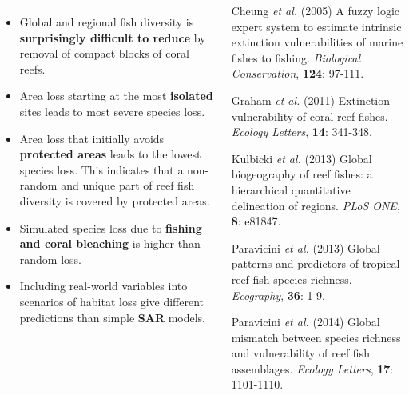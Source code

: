 \documentclass[25pt, a0paper, portrait, margin=0mm, innermargin=15mm,
     blockverticalspace=15mm, colspace=15mm, subcolspace=8mm]{tikzposter}
\begin{document}
\begin{columns}
{}


{
\begin{itemize}
  \item Global and regional fish diversity is \textbf{surprisingly difficult to reduce} 
  by removal of compact blocks of coral reefs.
  \item Area loss starting at the most \textbf{isolated} sites leads to most severe 			species loss. 
  \item Area loss that initially avoids \textbf{protected areas} leads to the lowest species loss. This indicates that a non-random 
  and unique part of reef fish diversity is covered by protected areas.
   \item Simulated species loss due to \textbf{fishing and coral bleaching} is 
  higher than random loss. 
  \item Including real-world variables into scenarios of habitat 
  loss give different predictions than simple \textbf{SAR} models. 
\end{itemize}

}


{
\begin{small}

  \hangindent=2cm Cheung \textit{et al.} (2005) A fuzzy logic expert system to 
  estimate intrinsic extinction vulnerabilities of marine fishes 
  to fishing. \textit{Biological Conservation}, \textbf{124}: 97-111.

  \hangindent=2cm Graham \textit{et al.} (2011) Extinction vulnerability of coral 
  reef fishes. \textit{Ecology Letters}, \textbf{14}: 341-348.

  \hangindent=2cm Kulbicki \textit{et al.} (2013) Global biogeography of reef 
  fishes: a hierarchical quantitative delineation of regions. 
  \textit{PLoS ONE}, \textbf{8}: e81847.

  \hangindent=2cm Paravicini \textit{et al.} (2013) Global patterns and predictors of 
  tropical reef fish species richness. \textit{Ecography}, \textbf{36}: 1-9.

  \hangindent=2cm Paravicini \textit{et al.} (2014) Global mismatch between 
  species richness and vulnerability of reef fish assemblages. 
  \textit{Ecology Letters}, \textbf{17}: 1101-1110.

\end{small}
}

\end{columns}
\end{document}

